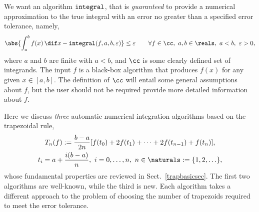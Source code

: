 \documentclass[]{article}
\DeclareMathOperator{\integ}{\texttt{\textup{integral}}}
\theoremstyle{definition}
\theoremstyle{remark}
\begin{document}
We want an algorithm $\integ$, that is \emph{guaranteed} to provide a numerical approximation to the true integral with an error no greater than a specified error tolerance, namely,
\begin{equation*}
\abs{\int_a^b f(x) \, \dif x - \integ(f,a,b,\varepsilon)} \le \varepsilon \qquad \forall f \in \cc,\ a, b \in \reals, \ a < b, \ \varepsilon > 0,
\end{equation*}
where $a$ and $b$ are finite with $a<b$, and $\cc$ is some clearly defined set of integrands.  The input $f$ is a black-box algorithm that produces $f(x)$ for any given $x \in [a,b]$.  The definition of $\cc$ will entail some general assumptions about $f$, but the user should not be required provide more detailed information about $f$.

Here we discuss \emph{three} automatic numerical integration algorithms based on the trapezoidal rule, 
\begin{multline} \label{trapruledef}
T_n(f) := \frac{b-a}{2n} [ f(t_0) + 2 f(t_1) + \cdots  + 2 f(t_{n-1}) + f(t_n)], \\
t_i=a+\frac{i(b-a)}{n}, \ i=0, \ldots, n, \ n \in \naturals := \{1, 2, \ldots \},
\end{multline}
whose fundamental properties are reviewed in Sect.\ \ref{trapbasicsec}.  The first two algorithms are well-known, while the third is new.  Each algorithm takes a different approach to the problem of choosing the number of trapezoids required to meet the error tolerance.
\end{document}
